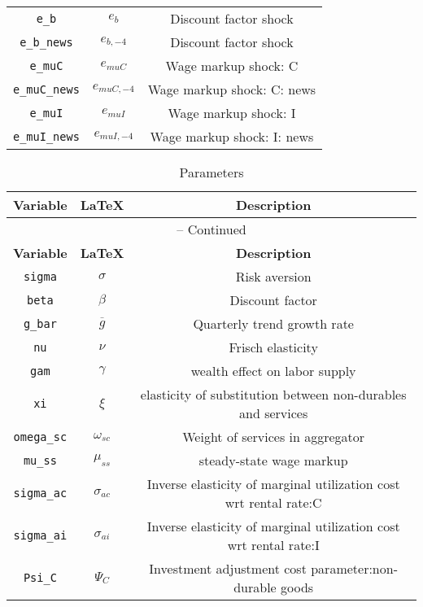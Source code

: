\begin{center}
\begin{longtable}{ccc}
\texttt{e\_b} & ${e_b}$ & Discount factor shock\\
\texttt{e\_b\_news} & ${e_{b,-4}}$ & Discount factor shock\\
\texttt{e\_muC} & ${e_{muC}}$ & Wage markup shock: C\\
\texttt{e\_muC\_news} & ${e_{muC,-4}}$ & Wage markup shock: C: news\\
\texttt{e\_muI} & ${e_{muI}}$ & Wage markup shock: I\\
\texttt{e\_muI\_news} & ${e_{muI,-4}}$ & Wage markup shock: I: news\\
\hline%
\end{longtable}
\end{center}
\begin{center}
\begin{longtable}{ccc}
\caption{Parameters}\\%
\hline%
\multicolumn{1}{c}{\textbf{Variable}} &
\multicolumn{1}{c}{\textbf{\LaTeX}} &
\multicolumn{1}{c}{\textbf{Description}}\\%
\hline\hline%
\endfirsthead
\multicolumn{3}{c}{{\tablename} \thetable{} -- Continued}\\%
\hline%
\multicolumn{1}{c}{\textbf{Variable}} &
\multicolumn{1}{c}{\textbf{\LaTeX}} &
\multicolumn{1}{c}{\textbf{Description}}\\%
\hline\hline%
\endhead
\texttt{sigma} & ${\sigma}$ & Risk aversion\\
\texttt{beta} & ${\beta}$ & Discount factor\\
\texttt{g\_bar} & ${\overline{g}}$ & Quarterly trend growth rate\\
\texttt{nu} & $\nu$ & Frisch elasticity\\
\texttt{gam} & $\gamma$ & wealth effect on labor supply\\
\texttt{xi} & $\xi$ & elasticity of substitution between non-durables and services\\
\texttt{omega\_sc} & $\omega_{sc}$ & Weight of services in aggregator\\
\texttt{mu\_ss} & $\mu_{ss}$ & steady-state wage markup\\
\texttt{sigma\_ac} & ${\sigma_{ac}}$ & Inverse elasticity of marginal utilization cost wrt rental rate:C\\
\texttt{sigma\_ai} & ${\sigma_{ai}}$ & Inverse elasticity of marginal utilization cost wrt rental rate:I\\
\texttt{Psi\_C} & ${\Psi_{C}}$ & Investment adjustment cost parameter:non-durable goods\\

\end{longtable}
\end{center}
